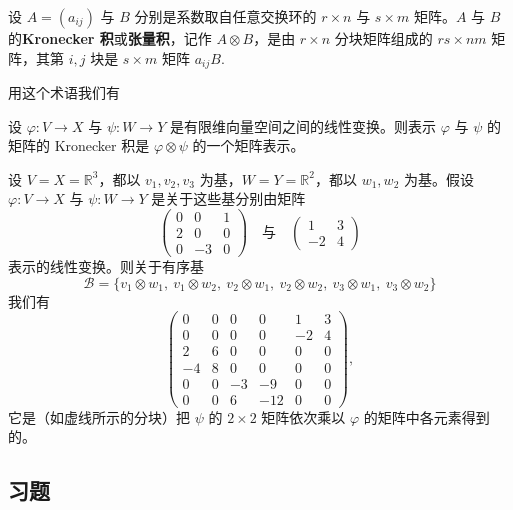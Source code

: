 \begin{definition}
设 \(A = (a_{ij})\) 与 \(B\) 分别是系数取自任意交换环的 \(r \times n\) 与 \(s \times m\) 矩阵。\(A\) 与 \(B\) 的\textbf{Kronecker 积}或\textbf{张量积}，记作 \(A \otimes B\)，是由 \(r \times n\) 分块矩阵组成的 \(rs \times nm\) 矩阵，其第 \(i, j\) 块是 \(s \times m\) 矩阵 \(a_{ij}B\).
\end{definition}

用这个术语我们有

\begin{proposition}\label{pro:11.17}
设 \(\varphi : V \to X\) 与 \(\psi : W \to Y\) 是有限维向量空间之间的线性变换。则表示 \(\varphi\) 与 \(\psi\) 的矩阵的 Kronecker 积是 \(\varphi \otimes \psi\) 的一个矩阵表示。
\end{proposition}

\begin{example}
设 \(V = X = \mathbb{R}^3\)，都以 \(v_1, v_2, v_3\) 为基，\(W = Y = \mathbb{R}^2\)，都以 \(w_1, w_2\) 为基。假设 \(\varphi : V \to X\) 与 \(\psi : W \to Y\) 是关于这些基分别由矩阵
\[
\begin{pmatrix} 0 & 0 & 1 \\ 2 & 0 & 0 \\ 0 & -3 & 0 \end{pmatrix} \quad \text{与} \quad \begin{pmatrix} 1 & 3 \\ -2 & 4 \end{pmatrix}
\]
表示的线性变换。则关于有序基
\[
\mathcal{B} = \{v_1 \otimes w_1,\ v_1 \otimes w_2,\ v_2 \otimes w_1,\ v_2 \otimes w_2,\ v_3 \otimes w_1,\ v_3 \otimes w_2\}
\]
我们有
\[
\left(\begin{array}{cc|cc|cc}
0 & 0 & 0 & 0 & 1 & 3\\
0 & 0 & 0 & 0 & -2 & 4\\ \hline
2 & 6 & 0 & 0 & 0 & 0\\
-4 & 8 & 0 & 0 & 0 & 0\\ \hline
0 & 0 & -3 & -9 & 0 & 0\\
0 & 0 & 6 & -12 & 0 & 0
\end{array}\right),
\]
它是（如虚线所示的分块）把 \(\psi\) 的 \(2 \times 2\) 矩阵依次乘以 \(\varphi\) 的矩阵中各元素得到的。
\end{example}

\subsection*{习题}

